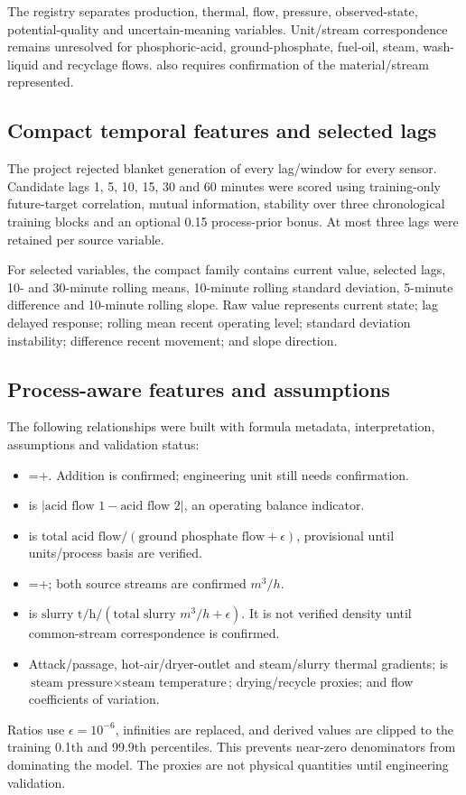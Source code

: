 \documentclass[10pt,a4paper]{article}
\begin{document}
The registry separates production, thermal, flow, pressure, observed-state, potential-quality and uncertain-meaning variables. Unit/stream correspondence remains unresolved for phosphoric-acid, ground-phosphate, fuel-oil, steam, wash-liquid and recyclage flows.  also requires confirmation of the material/stream represented.

\subsection{Compact temporal features and selected lags}
The project rejected blanket generation of every lag/window for every sensor. Candidate lags 1, 5, 10, 15, 30 and 60 minutes were scored using training-only future-target correlation, mutual information, stability over three chronological training blocks and an optional 0.15 process-prior bonus. At most three lags were retained per source variable.

For selected variables, the compact family contains current value, selected lags, 10- and 30-minute rolling means, 10-minute rolling standard deviation, 5-minute difference and 10-minute rolling slope. Raw value represents current state; lag delayed response; rolling mean recent operating level; standard deviation instability; difference recent movement; and slope direction.

\subsection{Process-aware features and assumptions}
The following relationships were built with formula metadata, interpretation, assumptions and validation status:
\begin{itemize}
\item {}=+. Addition is confirmed; engineering unit still needs confirmation.
\item {} is $|\text{acid flow 1}-\text{acid flow 2}|$, an operating balance indicator.
\item {} is $\text{total acid flow}/(\text{ground phosphate flow}+\epsilon)$, provisional until units/process basis are verified.
\item {}=+; both source streams are confirmed $m^3/h$.
\item {} is $\text{slurry t/h}/(\text{total slurry }m^3/h+\epsilon)$. It is not verified density until common-stream correspondence is confirmed.
\item Attack/passage, hot-air/dryer-outlet and steam/slurry thermal gradients;  is $\text{steam pressure}\times\text{steam temperature}$; drying/recycle proxies; and flow coefficients of variation.
\end{itemize}
Ratios use $\epsilon=10^{-6}$, infinities are replaced, and derived values are clipped to the training 0.1th and 99.9th percentiles. This prevents near-zero denominators from dominating the model. The proxies are not physical quantities until engineering validation.
\end{document}
